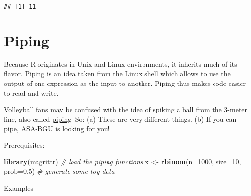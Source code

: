 \documentclass[]{book}
\newenvironment{Shaded}{\begin{snugshade}}{\end{snugshade}}
\newcommand{\KeywordTok}[1]{\textcolor[rgb]{0.13,0.29,0.53}{\textbf{#1}}}
\newcommand{\DataTypeTok}[1]{\textcolor[rgb]{0.13,0.29,0.53}{#1}}
\newcommand{\DecValTok}[1]{\textcolor[rgb]{0.00,0.00,0.81}{#1}}
\newcommand{\FloatTok}[1]{\textcolor[rgb]{0.00,0.00,0.81}{#1}}
\newcommand{\StringTok}[1]{\textcolor[rgb]{0.31,0.60,0.02}{#1}}
\newcommand{\CommentTok}[1]{\textcolor[rgb]{0.56,0.35,0.01}{\textit{#1}}}
\newcommand{\OperatorTok}[1]{\textcolor[rgb]{0.81,0.36,0.00}{\textbf{#1}}}
\newcommand{\NormalTok}[1]{#1}
\theoremstyle{definition}
\theoremstyle{definition}
\theoremstyle{definition}
\theoremstyle{remark}
\let\BeginKnitrBlock\begin \let\EndKnitrBlock\end
\begin{document}
\begin{verbatim}
## [1] 11
\end{verbatim}

\section{Piping}\label{piping}

Because R originates in Unix and Linux environments, it inherits much of
its flavor.
\href{http://ryanstutorials.net/linuxtutorial/piping.php}{Piping} is an
idea taken from the Linux shell which allows to use the output of one
expression as the input to another. Piping thus makes code easier to
read and write.

\BeginKnitrBlock{remark}
{}Volleyball fans may be confused with the idea
of spiking a ball from the 3-meter line, also called
\href{https://www.youtube.com/watch?v=DEaj4X_JhSY}{piping}. So: (a)
These are very different things. (b) If you can pipe,
\href{http://in.bgu.ac.il/sport/Pages/asa.aspx}{ASA-BGU} is looking for
you!
\EndKnitrBlock{remark}

Prerequisites:

\begin{Shaded}
\begin{Highlighting}[]
\KeywordTok{library}\NormalTok{(magrittr) }\CommentTok{# load the piping functions}
\NormalTok{x <-}\StringTok{ }\KeywordTok{rbinom}\NormalTok{(}\DataTypeTok{n=}\DecValTok{1000}\NormalTok{, }\DataTypeTok{size=}\DecValTok{10}\NormalTok{, }\DataTypeTok{prob=}\FloatTok{0.5}\NormalTok{) }\CommentTok{# generate some toy data}
\end{Highlighting}
\end{Shaded}

Examples

\begin{Shaded}
\end{Shaded}
\end{document}
